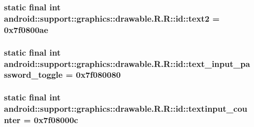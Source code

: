 \hypertarget{classandroid_1_1support_1_1graphics_1_1drawable_1_1_r_1_1id_22879920daf31e7555769d026f0ed4dc}{
\subsubsection[{text2}]{\setlength{\rightskip}{0pt plus 5cm}static final int android::support::graphics::drawable.R.R::id::text2 = 0x7f0800ae}}
\label{classandroid_1_1support_1_1graphics_1_1drawable_1_1_r_1_1id_22879920daf31e7555769d026f0ed4dc}


\hypertarget{classandroid_1_1support_1_1graphics_1_1drawable_1_1_r_1_1id_168365937b42bf8b48dc11c89942c047}{
\subsubsection[{text\_\-input\_\-password\_\-toggle}]{\setlength{\rightskip}{0pt plus 5cm}static final int android::support::graphics::drawable.R.R::id::text\_\-input\_\-password\_\-toggle = 0x7f080080}}
\label{classandroid_1_1support_1_1graphics_1_1drawable_1_1_r_1_1id_168365937b42bf8b48dc11c89942c047}


\hypertarget{classandroid_1_1support_1_1graphics_1_1drawable_1_1_r_1_1id_b0198923f9a35b6b8c980bdbbfa29123}{
\subsubsection[{textinput\_\-counter}]{\setlength{\rightskip}{0pt plus 5cm}static final int android::support::graphics::drawable.R.R::id::textinput\_\-counter = 0x7f08000c}}
\label{classandroid_1_1support_1_1graphics_1_1drawable_1_1_r_1_1id_b0198923f9a35b6b8c980bdbbfa29123}


